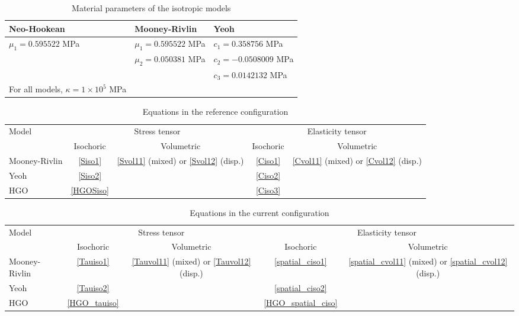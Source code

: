 \begin{table*}
\centering
\caption{Material parameters of the isotropic models}
\begin{tabular} { l  l  l }
	\hline
	Neo-Hookean & Mooney-Rivlin & Yeoh \\
	\hline
	$\mu_1 = 0.595522$ MPa & $\mu_1 = 0.595522$ MPa & $c_1 = 0.358756$ MPa \\
	& $\mu_2 = 0.050381$ MPa & $c_2 = - 0.0508009$ MPa \\
	& & $c_3 = 0.0142132$ MPa \\
	\hline
	For all models, $\kappa = 1 \times 10^5 $ MPa \\
	\hline
\end{tabular}
\label{parameters}
\end{table*}

\begin{table*}
\centering
\caption{Equations in the reference configuration}
\label{summary1}
\begin{tabular}{l c c c c} 
\toprule
\multirow{2}{*}{Model}  &  \multicolumn{2}{c}{Stress tensor} &  \multicolumn{2}{c}{Elasticity tensor} \\
\cmidrule(l){2-5}
& Isochoric  & Volumetric &  Isochoric  & Volumetric  \\
\midrule
Mooney-Rivlin  & \ref{Siso1} & \multirow{3}{*}{\ref{Svol11} (mixed) or \ref{Svol12} (disp.)} & \ref{Ciso1} & \multirow{3}{*}{\ref{Cvol11} (mixed) or \ref{Cvol12} (disp.)} \\
Yeoh & \ref{Siso2} & & \ref{Ciso2} &\\
HGO & \ref{HGOSiso} & & \ref{Ciso3} &\\ 
\bottomrule
\end{tabular}
\end{table*}

\begin{table*}
\centering
\caption{Equations in the current configuration}
\label{summary2}
\begin{tabular}{l c c c c} 
\toprule
\multirow{2}{*}{Model}  &  \multicolumn{2}{c}{Stress tensor} &  \multicolumn{2}{c}{Elasticity tensor} \\
\cmidrule(l){2-5}
& Isochoric  & Volumetric &  Isochoric  & Volumetric  \\
\midrule
Mooney-Rivlin  & \ref{Tauiso1} & \multirow{3}{*}{\ref{Tauvol11} (mixed) or \ref{Tauvol12} (disp.)} & \ref{spatial_ciso1} & \multirow{3}{*}{\ref{spatial_cvol11} (mixed) or \ref{spatial_cvol12} (disp.)} \\
Yeoh & \ref{Tauiso2} & & \ref{spatial_ciso2} &\\
HGO & \ref{HGO_tauiso} & & \ref{HGO_spatial_ciso} &\\ 
\bottomrule
\end{tabular}
\end{table*}
